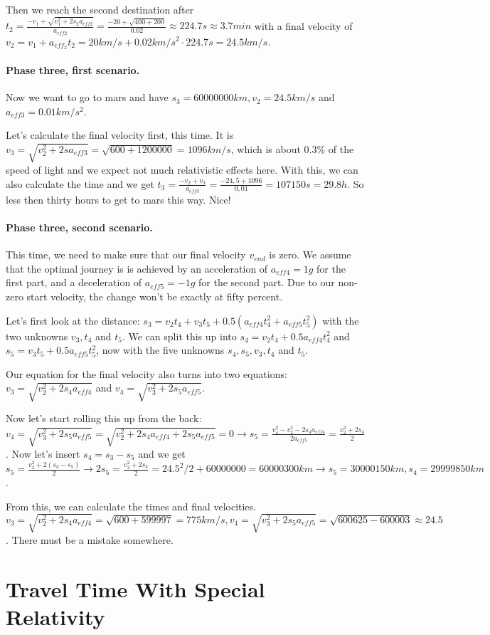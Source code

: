 \documentclass[10pt]{article}
\begin{document}
	Then we reach the second destination after $t_2 = \frac{-v_1+\sqrt{v^2_1+2s_2a_{eff2}}}{a_{eff2}} =\frac{-20+\sqrt{400+200}}{0.02} \approx 224.7 s \approx 3.7 min $ with a final velocity of $v_2 = v_1 + a_{eff_2}t_2 = 20 km/s + 0.02 km/s^2\cdot 224.7 s = 24.5 km/s$.
	
	\paragraph{Phase three, first scenario.}	
	Now we want to go to mars and have $s_3 = 60 000 000 km, v_2 = 24.5 km/s$ and $a_{eff3} = 0.01 km/s^2$.
	
	Let's calculate the final velocity first, this time. It is $v_3 = \sqrt{v^2_2 + 2sa_{eff3}} = \sqrt{600 + 1 200 000} = 1096 km/s$, which is about $0.3 \%$ of the speed of light and we expect not much relativistic effects here. With this, we can also calculate the time and we get $t_3 = \frac{-v_2 + v_3}{a_{eff3}} = \frac{-24,5 + 1096}{0,01} = 107150 s = 29.8 h$. So less then thirty hours to get to mars this way. Nice!
	
	\paragraph{Phase three, second scenario.}	
	This time, we need to make sure that our final velocity $v_{end}$ is zero. We assume that the optimal journey is is achieved by an acceleration of $a_{eff4} = 1g$ for the first part, and a deceleration of $a_{eff5} = -1g$ for the second part. Due to our non-zero start velocity, the change won't be exactly at fifty percent.
	
	Let's first look at the distance: $s_3 = v_2 t_4 + v_3t_5 + 0.5(a_{eff4}t^2_4 + a_{eff5}t^2_5)$ with the two unknowns $v_3, t_4$ and $t_5$. We can split this up into $s_4 = v_2 t_4 + 0.5a_{eff4}t^2_4$ and $s_5 = v_3 t_5 + 0.5a_{eff5}t^2_5$, now with the five unknowns  $s_4, s_5, v_3, t_4$ and $t_5$.
	
	Our equation for the final velocity also turns into two equations: $v_3 = \sqrt{v^2_2+2s_4 a_{eff4}}$ and $v_4 = \sqrt{v^2_3+2s_5 a_{eff5}}$.
	
	Now let's start rolling this up from the back: $v_4 = \sqrt{v^2_3+2s_5 a_{eff5}} = \sqrt{v^2_2+2s_4 a_{eff4}+2s_5a_{eff5}} = 0 \rightarrow s_5 = \frac{v^2_4-v^2_2-2s_4a_{eff4}}{2a_{eff5}} = \frac{v^2_2+2s_4}{2}$. Now let's insert $s_4 = s_3 - s_5$ and we get $s_5 = \frac{v^2_2 + 2(s_3 - s_5)}{2} \rightarrow 2s_5 = \frac{v^2_2 + 2s_3}{2} = 24.5^2/2 + 60 000 000 = 60 000 300 km \rightarrow s_5 = 30 000 150 km, s_4 = 29 999 850 km$.
	
	From this, we can calculate the times and final velocities. $v_3 = \sqrt{v^2_2 + 2s_4 a_{eff4}} = \sqrt{600 + 599 997} = 775 km/s, v_4 = \sqrt{v^2_3 + 2s_5 a_{eff5}} = \sqrt{600 625 - 600 003} \approx 24.5$. There must be a mistake somewhere.
	\section{Travel Time With Special Relativity}
\end{document}
